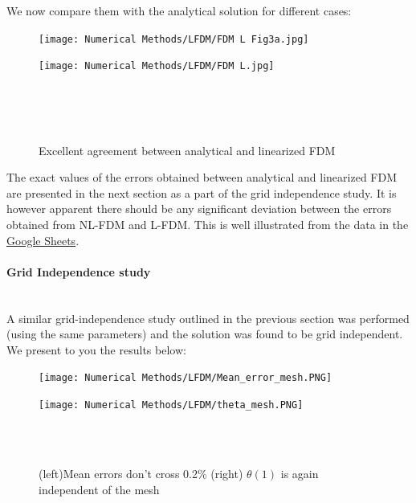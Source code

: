 \documentclass[12pt]{article}
\newcommand{\subsubsubsection}[1]{\paragraph{#1}\mbox{}\\}
\begin{document}
We now compare them with the analytical solution for different cases:

\begin{figure}[H]
\begin{minipage}{.5\textwidth}
    \hspace{-0.5cm}
    \vspace{-1.4cm}
  \texttt{[image: Numerical Methods/LFDM/FDM L Fig3a.jpg]}
  \label{fig:24}
\end{minipage}%
\begin{minipage}{.5\textwidth}
  \hspace{0.0cm}
  \vspace{-1.8cm}
  \texttt{[image: Numerical Methods/LFDM/FDM L.jpg]}
  \label{fig:25}
\end{minipage}
\\ \\ \\
\caption{Excellent agreement between analytical and linearized FDM}
\end{figure}
The exact values of the errors obtained between analytical and linearized FDM are presented in the next section as a part of the grid independence study. It is however apparent there should be any significant deviation between the errors obtained from NL-FDM and L-FDM. This is well illustrated from the data in the \href{https://docs.google.com/spreadsheets/d/14CD9h_oIQvpSYWhHdYkxh0rk-RfhSL3lAaR-XjAy2KA/edit?usp=sharing}{Google Sheets}.
\subsubsubsection{Grid Independence study}
A similar grid-independence study outlined in the previous section was performed (using the same parameters) and the solution was found to be grid independent. We present to you the results below: 

\begin{figure}[H]
\begin{minipage}{.5\textwidth}
    \hspace{-0.5cm}
    \vspace{-1.4cm}
  \texttt{[image: Numerical Methods/LFDM/Mean\_error\_mesh.PNG]}
  \label{fig:26}
\end{minipage}%
\begin{minipage}{.5\textwidth}
  \hspace{0.0cm}
  \vspace{-1.4cm}
  \texttt{[image: Numerical Methods/LFDM/theta\_mesh.PNG]}
  \label{fig:27}
\end{minipage}
\\ \\
\caption{(left)Mean errors don't cross 0.2\% (right) $\theta(1)$ is again independent of the mesh}
\end{figure}
\end{document}
